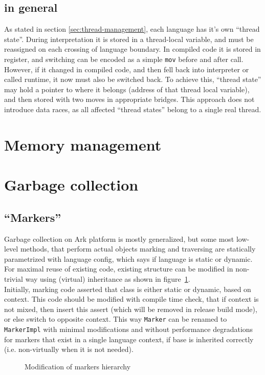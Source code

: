 \documentclass[times,specification,annotation]{itmo-student-thesis}
\begin{document}
\subsection{in general}
As stated in section \ref{sec:thread-management}, each language has it's own ``thread state''. During interpretation it is stored in a thread-local variable, and must be reassigned on each crossing of language boundary. In compiled code it is stored in register, and switching can be encoded as a simple \texttt{mov} before and after call. However, if it changed in compiled code, and then fell back into interpreter or called runtime, it now must also be switched back. To achieve this, ``thread state'' may hold a pointer to where it belongs (address of that thread local variable), and then stored with two moves in appropriate bridges. This approach does not introduce data races, as all affected ``thread states'' belong to a single real thread.

\section{Memory management}

\section{Garbage collection}
\subsection{``Markers''}
Garbage collection on Ark platform is mostly generalized, but some most low-level methods, that perform actual objects marking and traversing are statically parametrized with language config, which says if language is static or dynamic. For maximal reuse of existing code, existing structure can be modified in non-trivial way using (virtual) inheritance as shown in figure~\ref{fig:gc-markers}.\\
Initially, marking code asserted that class is either static or dynamic, based on context. This code should be modified with compile time check, that if context is not mixed, then insert this assert (which will be removed in release build mode), or else switch to opposite context. This way \texttt{Marker} can be renamed to \texttt{MarkerImpl} with minimal modifications and without performance degradations for markers that exist in a single language context, if base is inherited correctly (i.e. non-virtually when it is not needed).\\
\begin{figure}[H]
\caption{Modification of markers hierarchy}\label{fig:gc-markers}
\centering
\end{figure}
\end{document}

